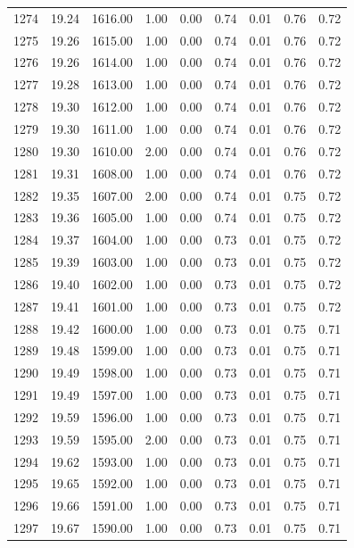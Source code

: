 \documentclass{article}\usepackage[]{graphicx}\usepackage[]{color}
\begin{document}
\begin{longtable}{rrrrrrrrr}
  1274 & 19.24 & 1616.00 & 1.00 & 0.00 & 0.74 & 0.01 & 0.76 & 0.72 \\ 
  1275 & 19.26 & 1615.00 & 1.00 & 0.00 & 0.74 & 0.01 & 0.76 & 0.72 \\ 
  1276 & 19.26 & 1614.00 & 1.00 & 0.00 & 0.74 & 0.01 & 0.76 & 0.72 \\ 
  1277 & 19.28 & 1613.00 & 1.00 & 0.00 & 0.74 & 0.01 & 0.76 & 0.72 \\ 
  1278 & 19.30 & 1612.00 & 1.00 & 0.00 & 0.74 & 0.01 & 0.76 & 0.72 \\ 
  1279 & 19.30 & 1611.00 & 1.00 & 0.00 & 0.74 & 0.01 & 0.76 & 0.72 \\ 
  1280 & 19.30 & 1610.00 & 2.00 & 0.00 & 0.74 & 0.01 & 0.76 & 0.72 \\ 
  1281 & 19.31 & 1608.00 & 1.00 & 0.00 & 0.74 & 0.01 & 0.76 & 0.72 \\ 
  1282 & 19.35 & 1607.00 & 2.00 & 0.00 & 0.74 & 0.01 & 0.75 & 0.72 \\ 
  1283 & 19.36 & 1605.00 & 1.00 & 0.00 & 0.74 & 0.01 & 0.75 & 0.72 \\ 
  1284 & 19.37 & 1604.00 & 1.00 & 0.00 & 0.73 & 0.01 & 0.75 & 0.72 \\ 
  1285 & 19.39 & 1603.00 & 1.00 & 0.00 & 0.73 & 0.01 & 0.75 & 0.72 \\ 
  1286 & 19.40 & 1602.00 & 1.00 & 0.00 & 0.73 & 0.01 & 0.75 & 0.72 \\ 
  1287 & 19.41 & 1601.00 & 1.00 & 0.00 & 0.73 & 0.01 & 0.75 & 0.72 \\ 
  1288 & 19.42 & 1600.00 & 1.00 & 0.00 & 0.73 & 0.01 & 0.75 & 0.71 \\ 
  1289 & 19.48 & 1599.00 & 1.00 & 0.00 & 0.73 & 0.01 & 0.75 & 0.71 \\ 
  1290 & 19.49 & 1598.00 & 1.00 & 0.00 & 0.73 & 0.01 & 0.75 & 0.71 \\ 
  1291 & 19.49 & 1597.00 & 1.00 & 0.00 & 0.73 & 0.01 & 0.75 & 0.71 \\ 
  1292 & 19.59 & 1596.00 & 1.00 & 0.00 & 0.73 & 0.01 & 0.75 & 0.71 \\ 
  1293 & 19.59 & 1595.00 & 2.00 & 0.00 & 0.73 & 0.01 & 0.75 & 0.71 \\ 
  1294 & 19.62 & 1593.00 & 1.00 & 0.00 & 0.73 & 0.01 & 0.75 & 0.71 \\ 
  1295 & 19.65 & 1592.00 & 1.00 & 0.00 & 0.73 & 0.01 & 0.75 & 0.71 \\ 
  1296 & 19.66 & 1591.00 & 1.00 & 0.00 & 0.73 & 0.01 & 0.75 & 0.71 \\ 
  1297 & 19.67 & 1590.00 & 1.00 & 0.00 & 0.73 & 0.01 & 0.75 & 0.71 \\ 

\end{longtable}
\end{document}
